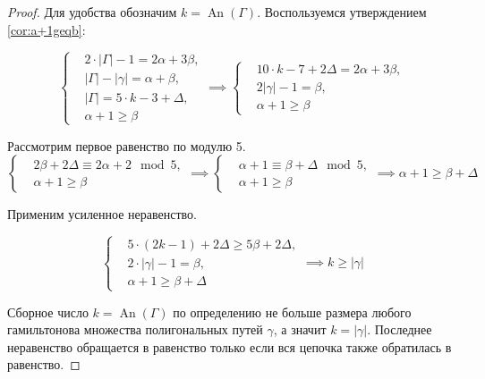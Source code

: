 \documentclass{article}
\theoremstyle{definition}
\newcommand{\An}{\operatorname{An}}
\newcommand{\D}{\Delta}
\begin{document}
\begin{proof}
    Для удобства обозначим $k = \An(\Gamma)$. Воспользуемся утверждением \ref{cor:a+1geqb}:

    \[
        \left\{
        \begin{aligned}
            & 2\cdot|\Gamma| - 1 = 2\alpha + 3\beta, \\
            & |\Gamma| - |\gamma| = \alpha + \beta, \\
            & |\Gamma| = 5\cdot k - 3 + \D, \\
            & \alpha + 1 \geq \beta 
        \end{aligned} 
        \right.
        \implies{} 
        \left\{
        \begin{aligned}
            & 10 \cdot k - 7 + 2\D = 2\alpha + 3\beta, \\
            & 2|\gamma| - 1 = \beta, \\
            & \alpha + 1 \geq \beta 
        \end{aligned} 
        \right.
    \]

    Рассмотрим первое равенство по модулю 5.
    \[
        \left\{
        \begin{aligned}
            & 2\beta + 2\D \equiv 2\alpha  + 2 \mod{5}, \\
            & \alpha + 1 \geq \beta 
        \end{aligned} 
        \right.
        \implies{} 
        \left\{
        \begin{aligned}
            & \alpha  + 1\equiv \beta + \D  \mod{5}, \\
            & \alpha + 1 \geq \beta 
        \end{aligned} 
        \right.
        \implies{\alpha + 1 \geq \beta + \D}
    \]

    Применим усиленное неравенство.

    \[
        \left\{
        \begin{aligned}
            & 5 \cdot (2k - 1) + 2\D \geq 5\beta + 2\D,\\
            & 2\cdot|\gamma| - 1 = \beta, \\
            & \alpha + 1 \geq \beta + \D 
        \end{aligned} 
        \right.
        \implies{k \geq |\gamma|}
    \]

    Сборное число $k = \An(\Gamma)$ по определению не больше размера любого гамильтонова множества полигональных путей $\gamma$, а значит $k = |\gamma|$. Последнее неравенство обращается в равенство только если вся цепочка также обратилась в равенство.
    
\end{proof}
\end{document}
